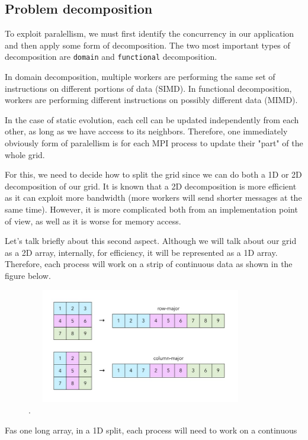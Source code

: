 \documentclass{report}
\begin{document}
\subsection{Problem decomposition}

To exploit paralellism, we must first identify the concurrency in our 
application and then apply some form of decomposition. The two most important 
types of decomposition are \texttt{domain} and \texttt{functional} decomposition. 

In domain decomposition, multiple workers are performing the same set of 
instructions on different portions of data (SIMD). In functional 
decomposition, workers are performing different instructions on possibly 
different data (MIMD). 
 
In the case of static evolution, each cell can be updated independently from each 
other, as long as we have acccess to its neighbors. Therefore, one immediately 
obviously form of paralellism is for each MPI process to update their "part" 
of the whole grid. 

For this, we need to decide how to split the grid since we can do both a 1D or 
2D decomposition of our grid. It is known that a 2D decomposition is more 
efficient as it can exploit more bandwidth (more workers will send shorter messages 
at the same time). However, it is more complicated both from an implementation 
point of view, as well as it is worse for memory access. 

Let's talk briefly about this second aspect. Although we will talk about our 
grid as a 2D array, internally, for efficiency, it will be represented as a 1D 
array. Therefore, each process will work on a strip of continuous data as 
shown in the figure below. 

\begin{figure}[H]
\centering
\includegraphics[width=10cm, height=5cm]{./other_images/arraydecomposition.jpg}
\caption{\label{fig:decomposition}.}
\end{figure}


Fas one long array, in a 1D split, each process will need to work on a continuous
\end{document}
